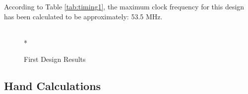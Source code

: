 According to Table \ref{tab:timing1}, the maximum clock frequency for this design has been calculated to be approximately: 53.5 MHz.

\begin{figure}[htp]
  \begin{center}
     \\*
  \end{center}
  \caption{First Design Results}
  \label{fig:design1_results}
\end{figure}

\subsection*{Hand Calculations}
